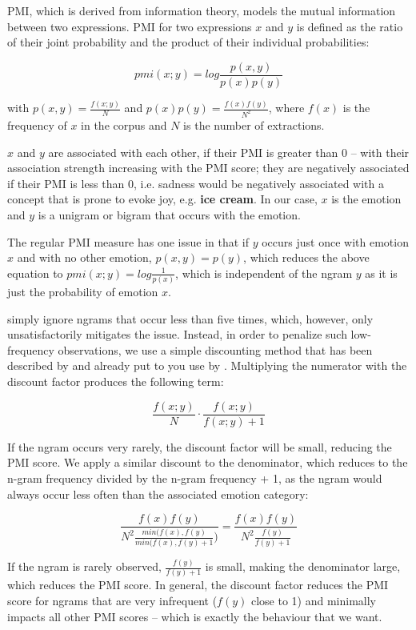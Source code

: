 PMI, which is derived from information theory, models the mutual information between two expressions. PMI for two expressions $x$ and $y$ is defined as the ratio of their joint probability and the product of their individual probabilities:

$$pmi(x;y) = log \dfrac{p(x,y)}{p(x)p(y)}$$

with $p(x,y) = \frac{f(x;y)}{N}$ and $p(x)p(y) = \frac{f(x)f(y)}{N^{2}}$, where $f(x)$ is the frequency of $x$ in the corpus and $N$ is the number of extractions.

$x$ and $y$ are associated with each other, if their PMI is greater than 0 -- with their association strength increasing with the PMI score; they are negatively associated if their PMI is less than 0, i.e. sadness would be negatively associated with a concept that is prone to evoke joy, e.g. \textbf{ice cream}.
In our case, $x$ is the emotion and $y$ is a unigram or bigram that occurs with the emotion.

The regular PMI measure has one issue in that if $y$ occurs just once with emotion $x$ and with no other emotion, $p(x,y) = p(y)$, which reduces the above equation to $pmi(x;y) = log \frac{1}{p(x)}$, which is independent of the ngram $y$ as it is just the probability of emotion $x$.

\citeauthor{twitter_hashtags_nrc} simply ignore ngrams that occur less than five times, which, however, only unsatisfactorily mitigates the issue. Instead, in order to penalize such low-frequency observations, we use a simple discounting method that has been described by \citeauthor{pmi_discount} and already put to you use by \citeauthor{matt_dissertation_pmi}. Multiplying the numerator with the discount factor produces the following term:

$$\frac{f(x;y)}{N} \cdot \frac{f(x;y)}{f(x;y) + 1}$$

If the ngram occurs very rarely, the discount factor will be small, reducing the PMI score. We apply a similar discount to the denominator, which reduces to the n-gram frequency divided by the n-gram frequency + 1, as the ngram would always occur less often than the associated emotion category:

$$\frac{f(x)f(y)}{N^{2}\frac{min(f(x),f(y)}{min(f(x),f(y) + 1})} = \frac{f(x)f(y)}{N^{2}\frac{f(y)}{f(y) + 1}}$$

If the ngram is rarely observed, $ \frac{f(y)}{f(y) + 1} $ is small, making the denominator large, which reduces the PMI score. In general, the discount factor reduces the PMI score for ngrams that are very infrequent ($f(y)$ close to 1) and minimally impacts all other PMI scores -- which is exactly the behaviour that we want.

